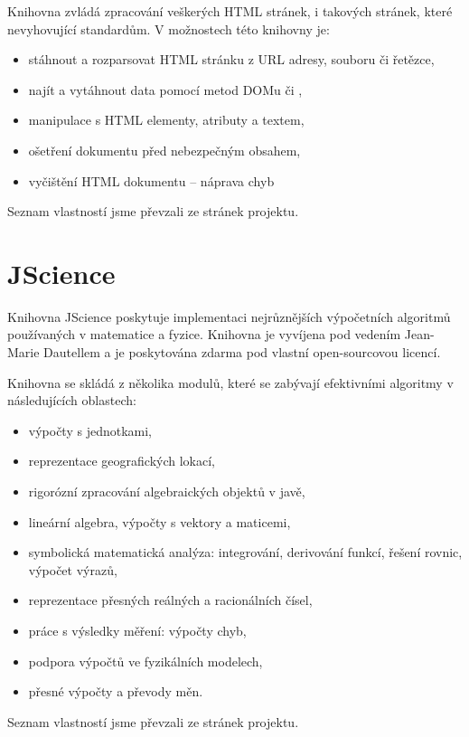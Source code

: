 Knihovna zvládá zpracování veškerých HTML stránek, i takových stránek, které nevyhovující standardům.
V možnostech této knihovny je:
\begin{itemize}
	\item stáhnout a rozparsovat HTML stránku z URL adresy, souboru či řetězce,
	\item najít a vytáhnout data pomocí metod DOMu či  ,
	\item manipulace s HTML elementy, atributy a textem,
	\item ošetření dokumentu před nebezpečným obsahem,
	\item vyčištění HTML dokumentu -- náprava chyb
\end{itemize}
Seznam vlastností jsme převzali ze stránek projektu\cite{jsoup}.

\section{JScience}
Knihovna JScience poskytuje implementaci nejrůznějších výpočetních algoritmů používaných v matematice a fyzice.
Knihovna je vyvíjena pod vedením Jean-Marie Dautellem a je poskytována zdarma pod vlastní open-sourcovou licencí.

Knihovna se skládá z několika modulů, které se zabývají efektivními algoritmy v následujících oblastech:
\begin{itemize}
	\item výpočty s jednotkami,
	\item reprezentace geografických lokací,
	\item rigorózní zpracování algebraických objektů v javě,
	\item lineární algebra, výpočty s vektory a maticemi,
	\item symbolická matematická analýza: integrování, derivování funkcí, řešení rovnic, výpočet výrazů,
	\item reprezentace přesných reálných a racionálních čísel,
	\item práce s výsledky měření: výpočty chyb,
	\item podpora výpočtů ve fyzikálních modelech,
	\item přesné výpočty a převody měn.
\end{itemize}
Seznam vlastností jsme převzali ze stránek projektu\cite{jscience}.

